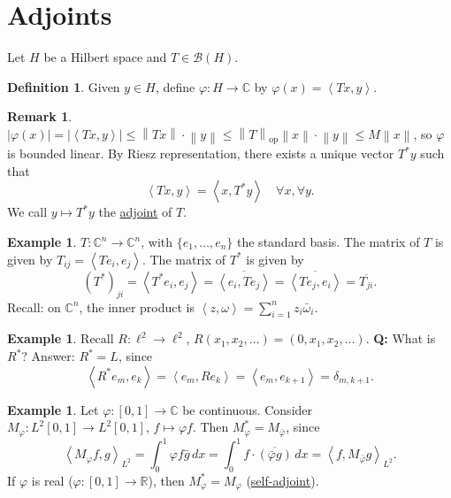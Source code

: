 \documentclass[12pt]{article}
\newcommand{\abs}[1]{\left| #1 \right|}
\newcommand{\norm}[1]{\left\| #1 \right\|}
\newcommand{\ip}[2]{\left\langle #1, #2 \right\rangle}
\newcommand{\R}{\mathbb{R}}
\newcommand{\C}{\mathbb{C}}
\newcommand{\cB}{\mathcal{B}}
\theoremstyle{definition}
\newtheorem{defn}[thm]{Definition}
\newtheorem{ex}[thm]{Example}
\newtheorem{rmk}[thm]{Remark}
\begin{document}
\section{Adjoints}

Let $H$ be a Hilbert space and $T \in \cB(H)$.

\begin{defn}
	Given $y \in H$, define $\varphi : H \to \C$ by $\varphi(x) = \ip{Tx}{y}$.
\end{defn}

\begin{rmk}
	$\abs{\varphi(x)} = \abs{\ip{Tx}{y}} \leq \norm{Tx} \cdot \norm{y} \leq \norm{T}_{\mathrm{op}} \norm{x} \cdot \norm{y} \leq M \norm{x}$, so $\varphi$ is bounded linear.
	By Riesz representation, there exists a unique vector $T^*y$ such that
	\begin{equation*}
		\ip{Tx}{y} = \ip{x}{T^*y} \quad \forall x, \forall y.
	\end{equation*}
	We call $y \mapsto T^*y$ the \underline{adjoint} of $T$.
\end{rmk}

\begin{ex}
	$T : \C^n \to \C^n$, with $\lbrace e_1, \dots, e_n \rbrace$ the standard basis.
	The matrix of $T$ is given by $T_{ij} = \ip{Te_i}{e_j}$.
	The matrix of $T^*$ is given by
	\begin{equation*}
		(T^*)_{ji} = \ip{T^*e_i}{e_j} = \overline{\ip{e_i}{Te_j}} = \overline{\ip{Te_j}{e_i}} = \overline{T_{ji}}.
	\end{equation*}
	Recall: on $\C^n$, the inner product is $\ip{z}{\omega} = \sum_{i=1}^n z_i \bar{\omega}_i$.
\end{ex}

\begin{ex}
	Recall $R : \ell^2 \to \ell^2$, $R(x_1, x_2, \dots) = (0, x_1, x_2, \dots)$.
	\textbf{Q: } What is $R^*$?
	Answer: $R^* = L$, since
	\begin{equation*}
		\ip{R^*e_m}{e_k} = \ip{e_m}{Re_k} = \ip{e_m}{e_{k+1}} = \delta_{m,k+1}.
	\end{equation*}
\end{ex}

\begin{ex}
	Let $\varphi : [0,1] \to \C$ be continuous.
	Consider $M_\varphi : L^2[0,1] \to L^2[0,1]$, $f \mapsto \varphi f$.
	Then $M_\varphi^* = M_{\bar\varphi}$, since
	\begin{equation*}
		\ip{M_\varphi f}{g}_{L^2} = \int_0^1 \varphi f \bar{g} \, dx = \int_0^1 f \cdot \overline{(\bar\varphi g)} \, dx = \ip{f}{M_{\bar\varphi} g}_{L^2}.
	\end{equation*}
	If $\varphi$ is real ($\varphi : [0,1] \to \R$), then $M_\varphi^* = M_\varphi$ (\underline{self-adjoint}).
\end{ex}
\end{document}
